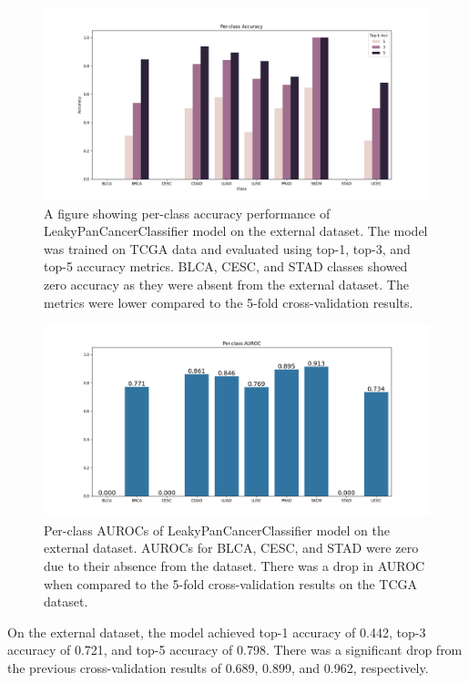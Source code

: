 \documentclass{l4proj}
\begin{document}
\begin{figure}[t]
    \centering
    \includegraphics[width=1\linewidth]{images/class_accuracy.png}
    \caption{A figure showing per-class accuracy performance of LeakyPanCancerClassifier model on the external dataset. The model was trained on TCGA data and evaluated using top-1, top-3, and top-5 accuracy metrics. BLCA, CESC, and STAD classes showed zero accuracy as they were absent from the external dataset. The metrics were lower compared to the 5-fold cross-validation results.}
    \label{fig:class-acc-ext}
\end{figure}

\begin{figure}[h!]
    \centering
    \includegraphics[width=1\linewidth]{images/class_auroc.png}
    \caption{Per-class AUROCs of LeakyPanCancerClassifier model on the external dataset. AUROCs for BLCA, CESC, and STAD were zero due to their absence from the dataset. There was a drop in AUROC when compared to the 5-fold cross-validation results on the TCGA dataset.}
    \label{fig:class-auroc-ext}
\end{figure}

On the external dataset, the model achieved top-1 accuracy of 0.442, top-3 accuracy of 0.721, and top-5 accuracy of 0.798. There was a significant drop from the previous cross-validation results of 0.689, 0.899, and 0.962, respectively. 
\end{document}
